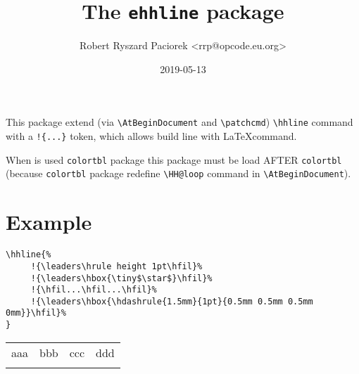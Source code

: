 \documentclass[a4paper]{article}
\begin{document}
\title{The \texttt{ehhline}  package}
\author{Robert Ryszard Paciorek <rrp@opcode.eu.org>}
\date{2019-05-13}
\maketitle

This package extend (via \verb$\AtBeginDocument$ and \verb$\patchcmd$) \verb$\hhline$ command with a \verb$!{...}$ token, which allows build line with \LaTeX command.

When is used \texttt{colortbl} package this package must be load AFTER \texttt{colortbl} (because \texttt{colortbl} package redefine \verb$\HH@loop$ command in \verb$\AtBeginDocument$).

\section{Example}

\begin{verbatim}
\hhline{%
     !{\leaders\hrule height 1pt\hfil}%
     !{\leaders\hbox{\tiny$\star$}\hfil}%
     !{\hfil...\hfil...\hfil}%
     !{\leaders\hbox{\hdashrule{1.5mm}{1pt}{0.5mm 0.5mm 0.5mm 0mm}}\hfil}%
}
\end{verbatim}

\begin{center}
\begin{tabular}{| c | c | c | c}
aaa & bbb & ccc & ddd\\
\hhline{%
     !{\leaders\hrule height 1pt\hfil}%
     !{\leaders\hbox{\tiny$\star$}\hfil}%
     !{\hfil...\hfil...\hfil}%
     !{\leaders\hbox{\hdashrule{1.5mm}{1pt}{0.5mm 0.5mm 0.5mm 0mm}}\hfil}%
}
\end{tabular}
\end{center}
\end{document}
